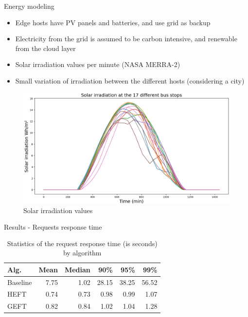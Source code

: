 \documentclass[Ligatures=TeX,table,svgnames,usetotalslideindicator,compress,10pt,aspectratio=169]{beamer}
\begin{document}
\begin{frame}{Energy modeling}
\begin{itemize}
  \item Edge hosts have PV panels and batteries, and use grid as backup
  \item Electricity from the grid is assumed to be carbon intensive, and renewable from the cloud layer    
    \item Solar irradiation values per minute (NASA MERRA-2)\footnotemark[3]
    \item Small variation of irradiation between the different hosts (considering a city)
\end{itemize}
      \begin{figure}[!h]
        \centering
        \includegraphics[width=.6\textwidth]{images/solar_energy.png}
        \caption{Solar irradiation values}
      \end{figure}

  \end{frame}


\begin{frame}{Results - Requests response time}

\begin{table}[h]
  
  \caption{Statistics of the request response time (is seconds) by algorithm }\label{tab:dcutilization} \centering

  \begin{tabular}{|l|r|r|r|r|r|}
   \hline
    
   \textbf{Alg.} &   \textbf{Mean} & \textbf{Median} & \textbf{90\%} & \textbf{95\%}& \textbf{99\%} \\
  \hline
  Baseline  & 7.75 & 1.02  & 28.15 & 38.25 & 56.52 \\
  \hline
  HEFT  & 0.74 &  0.73 & 0.98 & 0.99 &  1.07 \\
  \hline
  GEFT & 0.82 & 0.84  & 1.02 & 1.04 & 1.28 \\
  \hline
  
\end{tabular}  
\end{table}
\end{frame}
\end{document}
